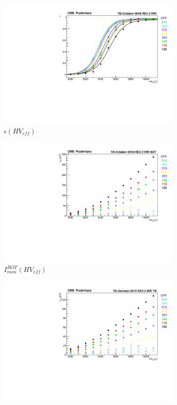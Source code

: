 	\begin{figure}[H]
    	\begin{subfigure}{\linewidth}
			\centering
    		\includegraphics[width = 0.5\linewidth]{fig/chapt5/HVeff-Graph-BARC-9.pdf}
        	\caption{\label{fig:october-sig:A} $\epsilon(HV_{eff})$}
    	\end{subfigure}
    	\begin{subfigure}{0.5\linewidth}
			\centering
    		\includegraphics[width = \linewidth]{fig/chapt5/Imon-Graph-BARC-9-BOT.pdf}
        	\caption{\label{fig:october-sig:B} $I_{mon}^{BOT}(HV_{eff})$}
    	\end{subfigure}
    	\begin{subfigure}{0.5\linewidth}
			\centering
    		\includegraphics[width = \linewidth]{fig/chapt5/Imon-Graph-BARC-9-TN.pdf}

\end{subfigure}
\end{figure}
